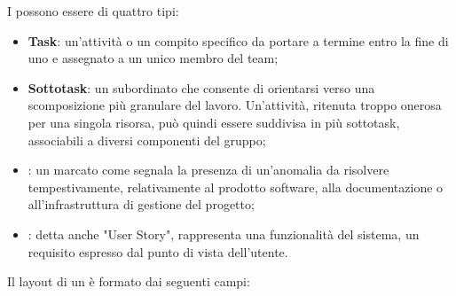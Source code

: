 \par I  possono essere di quattro tipi:
\begin{itemize}
  \item \textbf{Task}: un'attività o un compito specifico da portare a termine entro la fine di uno  e assegnato a un unico membro del team;
  \item \textbf{Sottotask}: un  subordinato che consente di orientarsi verso una scomposizione più granulare del lavoro. Un'attività, ritenuta troppo onerosa per una singola risorsa, può quindi essere suddivisa in più sottotask, associabili a diversi componenti del gruppo;
  \item \textbf{}: un  marcato come  segnala la presenza di un'anomalia da risolvere tempestivamente, relativamente al prodotto software, alla documentazione o all'infrastruttura di gestione del progetto;
  \item \textbf{}: detta anche "User Story", rappresenta una funzionalità del sistema, un requisito espresso dal punto di vista dell'utente.
\end{itemize}
\par Il layout di un  è formato dai seguenti campi:
